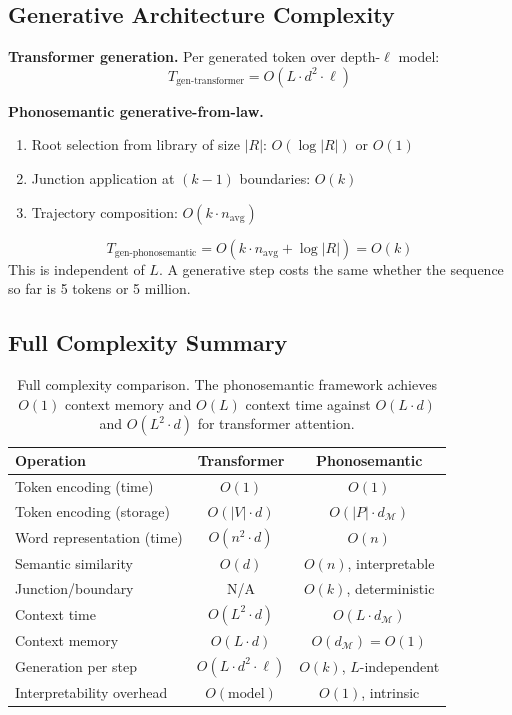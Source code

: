 \documentclass[12pt]{article}
\begin{document}
\subsection{Generative Architecture Complexity}

\textbf{Transformer generation.}
Per generated token over depth-$\ell$ model:
\[
T_\text{gen-transformer} = O(L \cdot d^2 \cdot \ell)
\]

\textbf{Phonosemantic generative-from-law.}
\begin{enumerate}
  \item Root selection from library of size $|R|$: $O(\log |R|)$ or $O(1)$
  \item Junction application at $(k-1)$ boundaries: $O(k)$
  \item Trajectory composition: $O(k \cdot n_\text{avg})$
\end{enumerate}
\[
T_\text{gen-phonosemantic} = O(k \cdot n_\text{avg} + \log |R|) = O(k)
\]
This is independent of $L$. A generative step costs the same whether the sequence so far is 5 tokens or 5 million.

\subsection{Full Complexity Summary}

\begin{table}[htbp]
\centering
\renewcommand{\arraystretch}{1.35}
\begin{tabular}{lcc}
\toprule
\textbf{Operation} & \textbf{Transformer} & \textbf{Phonosemantic} \\
\midrule
Token encoding (time) & $O(1)$ & $O(1)$ \\
Token encoding (storage) & $O(|V| \cdot d)$ & $O(|P| \cdot d_\mathcal{M})$ \\
Word representation (time) & $O(n^2 \cdot d)$ & $O(n)$ \\
Semantic similarity & $O(d)$ & $O(n)$, interpretable \\
Junction/boundary & N/A & $O(k)$, deterministic \\
Context time & $O(L^2 \cdot d)$ & $O(L \cdot d_\mathcal{M})$ \\
Context memory & $O(L \cdot d)$ & $O(d_\mathcal{M}) = O(1)$ \\
Generation per step & $O(L \cdot d^2 \cdot \ell)$ & $O(k)$, $L$-independent \\
Interpretability overhead & $O(\text{model})$ & $O(1)$, intrinsic \\
\bottomrule
\end{tabular}
\caption{Full complexity comparison. The phonosemantic framework achieves $O(1)$ context memory and $O(L)$ context time against $O(L \cdot d)$ and $O(L^2 \cdot d)$ for transformer attention.}
\end{table}
\end{document}
